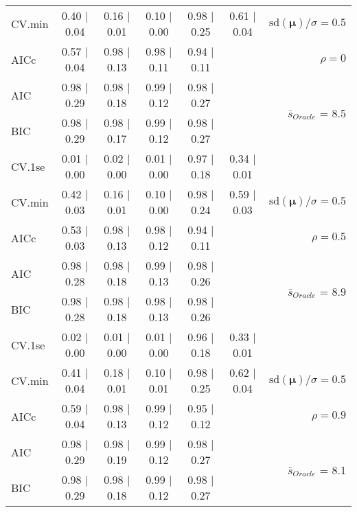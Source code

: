 \begin{table}
\begin{center}
\begin{tabular}{l*{5}{c}|r}
CV.min & 0.40 $\mid$ 0.04 & 0.16 $\mid$ 0.01 & 0.10 $\mid$ 0.00 & 0.98 $\mid$ 0.25 & 0.61 $\mid$ 0.04 &  $\mathrm{sd}(\mathbf{\mu})/\sigma=0.5$ \\
AICc & 0.57 $\mid$ 0.04 & 0.98 $\mid$ 0.13 & 0.98 $\mid$ 0.11 & 0.94 $\mid$ 0.11 & & $\rho=0$ \\
AIC & 0.98 $\mid$ 0.29 & 0.98 $\mid$ 0.18 & 0.99 $\mid$ 0.12 & 0.98 $\mid$ 0.27 & &  \multirow{2}{*}{$\bar{s}_{Oracle}$ = 8.5} \\
BIC & 0.98 $\mid$ 0.29 & 0.98 $\mid$ 0.17 & 0.99 $\mid$ 0.12 & 0.98 $\mid$ 0.27 & &  \\
 \hline 
CV.1se & 0.01 $\mid$ 0.00 & 0.02 $\mid$ 0.00 & 0.01 $\mid$ 0.00 & 0.97 $\mid$ 0.18 & 0.34 $\mid$ 0.01 & \\
CV.min & 0.42 $\mid$ 0.03 & 0.16 $\mid$ 0.01 & 0.10 $\mid$ 0.00 & 0.98 $\mid$ 0.24 & 0.59 $\mid$ 0.03 &  $\mathrm{sd}(\mathbf{\mu})/\sigma=0.5$ \\
AICc & 0.53 $\mid$ 0.03 & 0.98 $\mid$ 0.13 & 0.98 $\mid$ 0.12 & 0.94 $\mid$ 0.11 & & $\rho=0.5$ \\
AIC & 0.98 $\mid$ 0.28 & 0.98 $\mid$ 0.18 & 0.99 $\mid$ 0.13 & 0.98 $\mid$ 0.26 & &  \multirow{2}{*}{$\bar{s}_{Oracle}$ = 8.9} \\
BIC & 0.98 $\mid$ 0.28 & 0.98 $\mid$ 0.18 & 0.98 $\mid$ 0.13 & 0.98 $\mid$ 0.26 & &  \\
 \hline 
CV.1se & 0.02 $\mid$ 0.00 & 0.01 $\mid$ 0.00 & 0.01 $\mid$ 0.00 & 0.96 $\mid$ 0.18 & 0.33 $\mid$ 0.01 & \\
CV.min & 0.41 $\mid$ 0.04 & 0.18 $\mid$ 0.01 & 0.10 $\mid$ 0.01 & 0.98 $\mid$ 0.25 & 0.62 $\mid$ 0.04 &  $\mathrm{sd}(\mathbf{\mu})/\sigma=0.5$ \\
AICc & 0.59 $\mid$ 0.04 & 0.98 $\mid$ 0.13 & 0.99 $\mid$ 0.12 & 0.95 $\mid$ 0.12 & & $\rho=0.9$ \\
AIC & 0.98 $\mid$ 0.29 & 0.98 $\mid$ 0.19 & 0.99 $\mid$ 0.12 & 0.98 $\mid$ 0.27 & &  \multirow{2}{*}{$\bar{s}_{Oracle}$ = 8.1} \\
BIC & 0.98 $\mid$ 0.29 & 0.98 $\mid$ 0.18 & 0.99 $\mid$ 0.12 & 0.98 $\mid$ 0.27 & &  \\
 \hline 
\end{tabular}
\end{center}
\vspace{-1cm}
\end{table}




